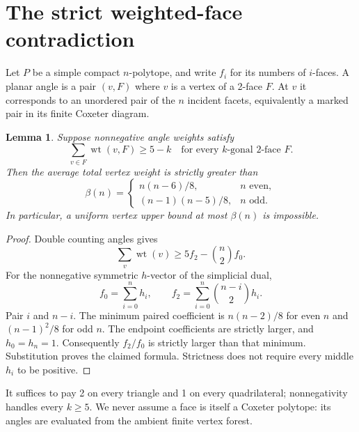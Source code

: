 \documentclass[11pt]{article}
\newtheorem{lemma}[theorem]{Lemma}
\newcommand{\wt}{\operatorname{wt}}
\begin{document}
\section{The strict weighted-face contradiction}
Let $P$ be a simple compact $n$-polytope, and write $f_i$ for its numbers of
$i$-faces. A planar angle is a pair $(v,F)$ where $v$ is a vertex of a
2-face $F$. At $v$ it corresponds to an unordered pair of the $n$ incident
facets, equivalently a marked pair in its finite Coxeter diagram.
\begin{lemma}\label{lem:count}
Suppose nonnegative angle weights satisfy
\[
 \sum_{v\in F}\wt(v,F)\ge 5-k
 \quad\text{for every $k$-gonal 2-face $F$}.
\]
Then the average total vertex weight is strictly greater than
\[
 \beta(n)=
 \begin{cases} n(n-6)/8,&n\text{ even},\\
 (n-1)(n-5)/8,&n\text{ odd}.
 \end{cases}
\]
In particular, a uniform vertex upper bound at most $\beta(n)$ is impossible.
\end{lemma}
\begin{proof}
Double counting angles gives
\[
 \sum_v\wt(v)\ge 5f_2-\binom n 2 f_0.
\]
For the nonnegative symmetric $h$-vector of the simplicial dual,
\[
 f_0=\sum_{i=0}^n h_i,\qquad
 f_2=\sum_{i=0}^n\binom{n-i}{2}h_i.
\]
Pair $i$ and $n-i$. The minimum paired coefficient is
$n(n-2)/8$ for even $n$ and $(n-1)^2/8$ for odd $n$.
The endpoint coefficients are strictly larger, and $h_0=h_n=1$.
Consequently $f_2/f_0$ is strictly larger than that minimum. Substitution
proves the claimed formula. Strictness does not require every middle
$h_i$ to be positive.
\end{proof}
It suffices to pay 2 on every triangle and 1 on every quadrilateral;
nonnegativity handles every $k\ge 5$. We never assume a face is itself a
Coxeter polytope: its angles are evaluated from the ambient finite vertex
forest.
\end{document}
